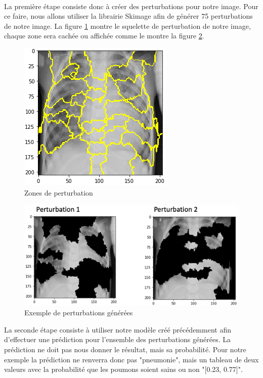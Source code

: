 \paragraph{}La première étape consiste donc à créer des perturbations pour notre image. Pour ce faire, nous allons utiliser la librairie Skimage afin de générer 75 perturbations de notre image. La figure \ref{limePerturbSchema} montre le squelette de perturbation de notre image, chaque zone sera cachée ou affichée comme le montre la figure \ref{limePerturbExemple}.\par
\begin{figure}[h]
    \includegraphics[scale=0.6]{src_img/limePerturbSchema.png}
    \caption{Zones de perturbation}
    \label{limePerturbSchema}
\end{figure}

\begin{figure}[h]
    \includegraphics[scale=0.7]{src_img/limePerturbations.png}
    \caption{Exemple de perturbations générées}
    \label{limePerturbExemple}
\end{figure}

La seconde étape consiste à utiliser notre modèle créé précédemment afin d'effectuer une prédiction pour l'ensemble des perturbations générées. La prédiction ne doit pas nous donner le résultat, mais sa probabilité. Pour notre exemple la prédiction ne renverra donc pas "pneumonie", mais un tableau de deux valeurs avec la probabilité que les poumons soient sains ou non "[0.23, 0.77]".

